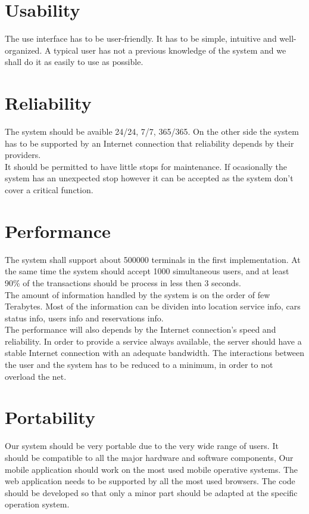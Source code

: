 \section{Usability}
 The use interface has to be user-friendly. It has to be simple, intuitive and well-organized. A typical user has not a previous knowledge of the system and we shall do it as easily to use as possible.

\section{Reliability}
The system should be avaible 24/24, 7/7, 365/365. On the other side the system has to be supported by an Internet connection that reliability depends by their providers. 
\\It should be permitted to have little stops for maintenance. If ocasionally the system has an unexpected stop however it can be accepted as the system don't cover a critical function.

\section{Performance}
The system shall support about 500000 terminals in the first implementation. At the same time the system should accept 1000 simultaneous users, and at least 90\% of the transactions should be process in less then 3 seconds.
\\The amount of information handled by the system is on the order of few Terabytes. Most of the information can be dividen into location service info, cars status info, users info and reservations info.
\\The performance will also depends by the Internet connection’s speed and reliability. In order to provide a service always available, the server should have a stable Internet connection with an adequate bandwidth.
The interactions between the user and the system has to be reduced to a minimum, in order to not overload the net. 

\section{Portability}
Our system should be very portable due to the very wide range of users. It should be compatible to all the major hardware and software components, Our mobile application should work on the most used mobile operative systems. The web application needs to be supported by all the most used browsers. The code should be developed so that only a minor part should be adapted at the specific operation system.

